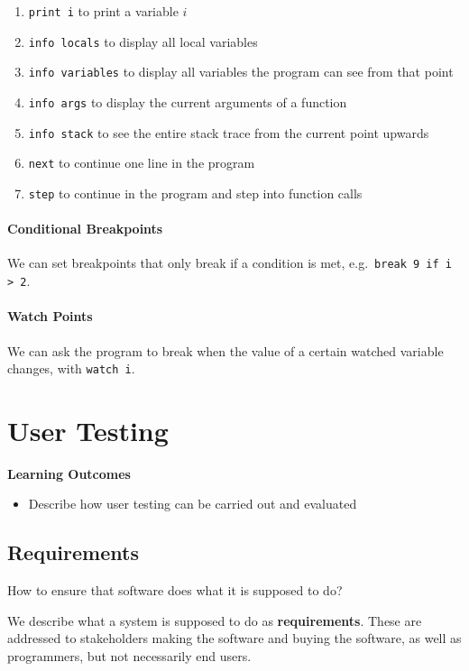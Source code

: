\begin{enumerate}
	\item \texttt{print i} to print a variable \( i \)
	\item \texttt{info locals} to display all local variables
	\item \texttt{info variables} to display all variables the program can see from that point
	\item \texttt{info args} to display the current arguments of a function 
	\item \texttt{info stack} to see the entire stack trace from the current point upwards
	\item \texttt{next} to continue one line in the program 
	\item \texttt{step} to continue in the program and step into function calls 
\end{enumerate}

\paragraph{Conditional Breakpoints} We can set breakpoints that only break if a condition is met, e.g.\ \texttt{break 9 if i > 2}.

\paragraph{Watch Points} We can ask the program to break when the value of a certain watched variable changes, with \texttt{watch i}.

\section{User Testing}
\begin{mdframed}
	\textbf{Learning Outcomes}
	\begin{itemize}[label={\checkmark}]
	\item Describe how user testing can be carried out and evaluated
	\end{itemize}
\end{mdframed}

\subsection{Requirements}
How to ensure that software does what it is supposed to do?

We describe what a system is supposed to do as \textbf{requirements}. These are addressed to stakeholders making the software and buying the software, as well as programmers, but not necessarily end users.

